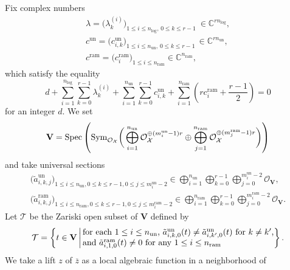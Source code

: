 \documentclass[pdftex]{sigma}
\numberwithin{equation}{section}
\newcommand\Spec{\mathop{\rm Spec}\nolimits}
\begin{document}
Fix complex numbers
\begin{gather*}
 \lambda
 =
 \big( \lambda^{(i)}_k \big)
 _{1\leq i\leq n_{\mathrm{log}} , \, 0\leq k\leq r-1} \
 \in\mathbb{C}^{rn_{\mathrm{log}}},
 \\
 c^{\mathrm{un}}
 =
 \big( c^{\mathrm{un}}_{i,k} \big)
 _{1\leq i\leq n_{\mathrm{un}} , \, 0\leq k\leq r-1} \,
 \in\mathbb{C}^{r n_{\mathrm{un}}},
 \\
 c^{\mathrm{ram}}
 =
\big( c^{\mathrm{ram}}_i \big)
 _{1\leq i\leq n_{\mathrm{ram}}}\in\mathbb{C}^{n_{\mathrm{ram}}},
\end{gather*}
which satisfy the equality
\begin{equation*}
 d+\sum_{i=1}^{n_{\mathrm{log}}}\sum_{k=0}^{r-1}\lambda^{(i)}_k
 +\sum_{i=1}^{n_{\mathrm{un}}}\sum_{k=0}^{r-1} c^{\mathrm{un}}_{i,k}
 +\sum_{i=1}^{n_{\mathrm{ram}}} \left(rc^{\mathrm{ram}}_i+\frac{r-1}{2} \right)
 =0
\end{equation*}
for an integer $d$.
We set
\[
 \mathbf{V}
 =\Spec \left( \mathrm{Sym}_{{\mathcal O}_{\mathcal X}} \bigg(\bigoplus_{i=1}^{n_{\mathrm{un}}}
 {\mathcal O}_{\mathcal X}^{\oplus (m^{\mathrm{un}}_i-1)r}
 \oplus
 \bigoplus_{j=1}^{n_{\mathrm{ram}}} {\mathcal O}_{\mathcal X}
 ^{\oplus (m^{\mathrm{ram}}_j-1)r} \bigg) \right)
\]
and
take universal sections
\begin{gather*}
 \big( \tilde{a}^{\mathrm{un}}_{i,k,j}\big)
 _{1\leq i\leq n_{\mathrm{un}}, 0\leq k \leq r-1, 0\leq j\leq m^{\mathrm{un}}_i-2}
 \in\bigoplus_{i=1}^{n_{\mathrm{un}}}\bigoplus_{k=0}^{r-1}\bigoplus_{j=0}^{m^{\mathrm{un}}_i-2}
 {\mathcal O}_{\mathbf{V}},
 \\
\big(\tilde{a}^{\mathrm{ram}}_{i,k,j}\big)
 _{1\leq i\leq n_{\mathrm{ram}},0\leq k\leq r-1,0\leq j\leq m^{\mathrm{ram}}_i-2}
 \in\bigoplus_{i=1}^{n_{\mathrm{ram}}}\bigoplus_{k=0}^{r-1}\bigoplus_{j=0}^{m^{\mathrm{ram}}_i-2}
 {\mathcal O}_{\mathbf{V}}.
\end{gather*}
Let ${\mathcal T}$ be the Zariski open subset of
$\mathbf{V}$ defined by
\[
 {\mathcal T}=
 \left\{ t\in \mathbf{V} \, \middle| \,
 \begin{array}{@{}l@{}}
 \text{for each $1\leq i\leq n_{\mathrm{un}}$,
 $\tilde{a}^{\mathrm{un}}_{i,k,0}(t)\neq \tilde{a}^{\mathrm{un}}_{i,k',0}(t)$ for $k\neq k'$,}
 \\
 \text{and $\tilde{a}^{\mathrm{ram}}_{i,1,0}(t)\neq 0$ for any $1\leq i\leq n_{\mathrm{ram}}$}
 \end{array}
 \right\}.
\]
We take a lift $z$ of $\overline{z}$ as a local algebraic function in a neighborhood of
\end{document}
